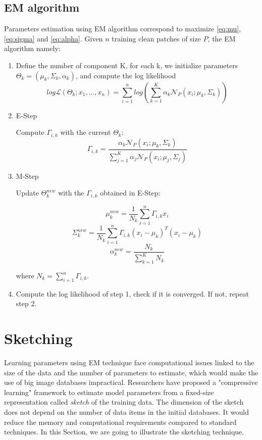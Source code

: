\documentclass[12pt,a4paper]{article}
\begin{document}
\subsection{EM algorithm}
Parameters estimation using EM algorithm correspond to maximize \eqref{eq:mu}, \eqref{eq:sigma} and \eqref{eq:alpha}.
Given $n$ training clean patches of size $P$, the EM algorithm namely:
\begin{enumerate}
    \item Define the number of component K, for each k, we initialize parameters $\Theta_k = (\mu_k, \Sigma_k,\alpha_k)$, and compute the log likelihood
    \begin{equation}
        log \mathcal{L}(\Theta_k; x_1,...,x_n) = \sum_{i = 1}^n log (\sum_{k = 1}^K \alpha_k\mathcal{N}_P(x_i;\mu_k,\Sigma_k))
    \end{equation}
    \item E\hyp{}Step
    
    Compute $\Gamma_{i,k}$ with the current $\Theta_k$: 
    \begin{equation}
    \Gamma_{i,k} = \frac{\alpha_k \mathcal{N}_P(x_i;\mu_k,\Sigma_k)}{\sum_{j = 1}^K \alpha_j\mathcal{N}_P(x_i;\mu_j,\Sigma_j)}
    \end{equation}
    \item M\hyp{}Step
    
    Update $\Theta_k^{new}$ with the $\Gamma _{i,k}$ obtained in E\hyp{}Step:
    
    \begin{equation}
        \mu_k^{new} = \frac{1}{N_k}\sum_{i = 1}^n \Gamma_{i,k} x_i 
    \end{equation}
    \begin{equation}
        \Sigma_k^{new}=\frac{1}{N_k}\sum_{i = 1}^n \Gamma _{i,k} (x_i -\mu_k)^T(x_i -\mu_k)
    \end{equation}
   \begin{equation}
       \alpha_k^{new} = \frac{N_k}{\sum_{k=1}^K N_k}
   \end{equation}

where $N_k = \sum_{i = 1}^n \Gamma _{i,k} $.
\item Compute the log likelihood of step 1, check if it is converged. 
If not, repeat step 2.
\end{enumerate}
\section{Sketching}
Learning parameters using EM technique face computational issues linked to the size of the data and the number of parameters to estimate, which would make the use of big image databases impractical.
Researchers \cite{keriven:hal-01329195} have proposed a "compressive learning" framework to estimate model parameters from a fixed\hyp{}size representation called \textit{sketch} of the training data.
The dimension of the sketch does not depend on the number of data items in the initial databases.
It would reduce the memory and computational requirements compared to standard techniques.
In this Section, we are going to illustrate the sketching technique. 
\end{document}
